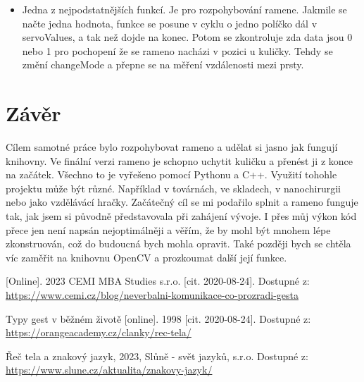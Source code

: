\documentclass[12pt, a4paper,
twoside,        %
openright
]{report}
\begin{document}
{\begin{lstlisting}[style=Python, caption={funkce na rozpohybocání ramene}]
	\end{lstlisting}
	
	\begin{itemize}
		\item Jedna z nejpodstatnějších funkcí. Je pro rozpohybování ramene.
		Jakmile se načte jedna hodnota, funkce se posune v cyklu o jedno políčko dál v servoValues, a tak než dojde na konec. Potom se zkontroluje zda data jsou 0 nebo 1 pro pochopení že se rameno nacházi v pozici u  kuličky. Tehdy se změní changeMode a přepne se na měření vzdálenosti mezi prsty.
		
	\end{itemize}
	
	
	
	
	
	
	
	\chapter*{Závěr}
	
	Cílem samotné práce bylo rozpohybovat rameno a udělat si jasno jak fungují knihovny. Ve finální verzi rameno je schopno uchytit kuličku a přenést ji z konce na začátek. Všechno to je vyřešeno pomocí Pythonu a C++. Využití tohohle projektu může být různé. Například v továrnách, ve skladech, v nanochirurgii nebo jako vzdělávácí hračky. Začátečný cíl se mi podařilo splnit a rameno funguje tak, jak jsem si původně představovala při zahájení vývoje. I přes můj výkon kód přece jen není napsán nejoptimálněji a věřím, že by mohl být mnohem lépe zkonstruován, což do budoucná bych mohla opravit. Také později bych se chtěla víc zaměřit na knihovnu OpenCV a prozkoumat další její funkce. 

	
	\renewcommand\bibname{Literatura}
	\begin{thebibliography}{99}
		 [Online].  2023 CEMI MBA Studies s.r.o. [cit. 2020-08-24]. Dostupné z: \url{https://www.cemi.cz/blog/neverbalni-komunikace-co-prozradi-gesta}
		
		 {Typy gest v běžném životě} [online]. 1998 [cit. 2020-08-24]. Dostupné z: \url{https://orangeacademy.cz/clanky/rec-tela/}
		
		 Řeč tela a znakový jazyk, 2023, Slůně - svět jazyků, s.r.o. Dostupné z: \url{https://www.slune.cz/aktualita/znakovy-jazyk/}
		

\end{thebibliography}}
\end{document}
